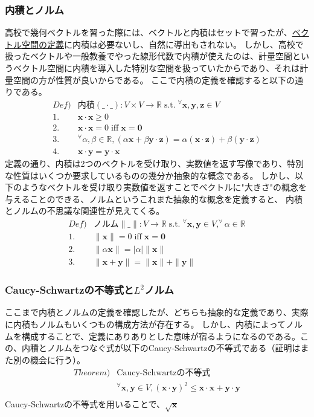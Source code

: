 \documentclass[10pt]{ujarticle}
\begin{document}
\subsubsection{内積とノルム}
高校で幾何ベクトルを習った際には、ベクトルと内積はセットで習ったが、\hyperlink{vecsp}{ベクトル空間の定義}に内積は必要ないし、自然に導出もされない。
しかし、高校で扱ったベクトルや一般教養でやった線形代数で内積が使えたのは、計量空間というベクトル空間に内積を導入した特別な空間を扱っていたからであり、それは計量空間の方が性質が良いからである。
ここで内積の定義を確認すると以下の通りである。
$$
\begin{aligned}
  Def)&\text{内積}(\_\cdot\_):V\times V\rightarrow\mathbb{R}\;\text{s.t.}\;^\forall\mathbf{x},\mathbf{y},\mathbf{z}\in V\\
  1.&\mathbf{x}\cdot\mathbf{x}\geq 0\\
  2.&\mathbf{x}\cdot\mathbf{x}=0\;\text{iff}\;\mathbf{x}=\mathbf{0}\\
  3.&^\forall\alpha,\beta\in\mathbb{R},(\alpha\mathbf{x}+\beta\mathbf{y}\cdot\mathbf{z})=\alpha(\mathbf{x}\cdot\mathbf{z})+\beta(\mathbf{y}\cdot\mathbf{z})\\
  4.&\mathbf{x}\cdot\mathbf{y}=\mathbf{y}\cdot\mathbf{x}
\end{aligned}
$$
定義の通り、内積は2つのベクトルを受け取り、実数値を返す写像であり、特別な性質はいくつか要求しているものの幾分か抽象的な概念である。
しかし、以下のようなベクトルを受け取り実数値を返すことでベクトルに"大きさ"の概念を与えることのできる、ノルムというこれまた抽象的な概念を定義すると、
内積とノルムの不思議な関連性が見えてくる。
$$
\begin{aligned}
  Def)&\text{ノルム}\|\_\|:V\rightarrow\mathbb{R}\;\text{s.t.}\;^\forall\mathbf{x},\mathbf{y}\in V,^\forall\alpha\in\mathbb{R}\\
  1.&\|\mathbf{x}\|=0\;\text{iff}\;\mathbf{x}=\mathbf{0}\\
  2.&\|\alpha\mathbf{x}\|=|\alpha|\|\mathbf{x}\|\\
  3.&\|\mathbf{x}+\mathbf{y}\|=\|\mathbf{x}\|+\|\mathbf{y}\|
\end{aligned}
$$

\subsubsection{Caucy-Schwartzの不等式と$L^2$ノルム}
ここまで内積とノルムの定義を確認したが、どちらも抽象的な定義であり、実際に内積もノルムもいくつもの構成方法が存在する。
しかし、内積によってノルムを構成することで、定義にありありとした意味が宿るようになるのである。この、内積とノルムをつなぐ式が以下のCaucy-Schwartzの不等式である（証明はまた別の機会に行う）。
$$
\begin{aligned}
  Theorem)&\text{Caucy-Schwartzの不等式}\\
  &^\forall\mathbf{x},\mathbf{y}\in V,(\mathbf{x}\cdot\mathbf{y})^2\leq\mathbf{x}\cdot\mathbf{x}+\mathbf{y}\cdot\mathbf{y}\\
\end{aligned}
$$
Caucy-Schwartzの不等式を用いることで、$\sqrt{\mathbf{x}}$
\end{document}
